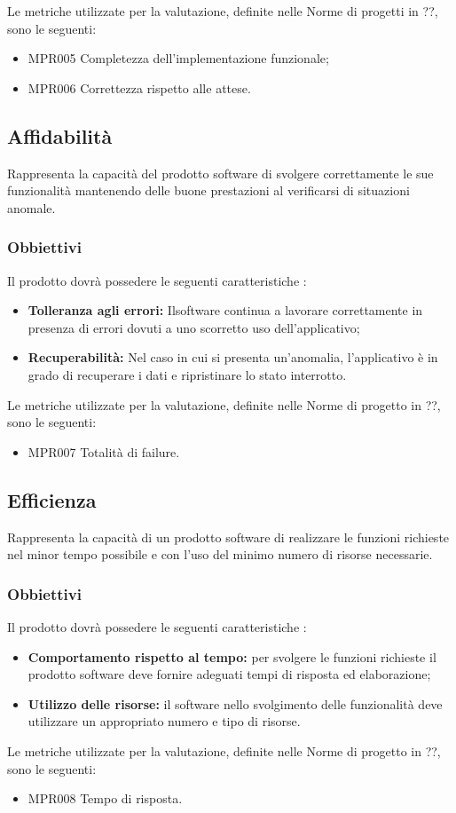 Le metriche utilizzate per la valutazione, definite nelle Norme di progetti in ??, sono le seguenti:
\begin{itemize}
	\item MPR005 Completezza dell'implementazione funzionale;
	\item MPR006 Correttezza rispetto alle attese.
\end{itemize}

\subsection{Affidabilità}
Rappresenta la capacità del prodotto software di svolgere correttamente le sue funzionalità mantenendo delle buone prestazioni al verificarsi di situazioni anomale.

\subsubsection{Obbiettivi } Il prodotto dovrà possedere le seguenti caratteristiche :
\begin{itemize}
	\item \textbf{Tolleranza agli errori:} Ilsoftware continua a lavorare correttamente in presenza di errori dovuti a uno scorretto uso dell'applicativo;
	\item \textbf{Recuperabilità:} Nel caso in cui si presenta un'anomalia, l'applicativo è in grado di recuperare i dati e ripristinare lo stato interrotto.
\end{itemize}

Le metriche utilizzate per la valutazione, definite nelle Norme di progetto in ??, sono le seguenti:
\begin{itemize}
	\item MPR007 Totalità di failure.
\end{itemize}


\subsection{Efficienza}
Rappresenta la capacità di un prodotto software di realizzare le funzioni richieste nel minor tempo possibile e con l'uso del minimo numero di risorse necessarie. 
\subsubsection{Obbiettivi } Il prodotto dovrà possedere le seguenti caratteristiche :
\begin{itemize}
	\item \textbf{Comportamento rispetto al tempo:} per svolgere le  funzioni richieste il prodotto software deve fornire adeguati tempi di risposta ed elaborazione;
	\item \textbf{Utilizzo delle risorse:} il software nello svolgimento delle funzionalità deve utilizzare un appropriato numero e tipo di risorse.
\end{itemize}
Le metriche utilizzate per la valutazione, definite nelle Norme di progetto in ??, sono le seguenti:
\begin{itemize}
	\item MPR008 Tempo di risposta.
\end{itemize}

